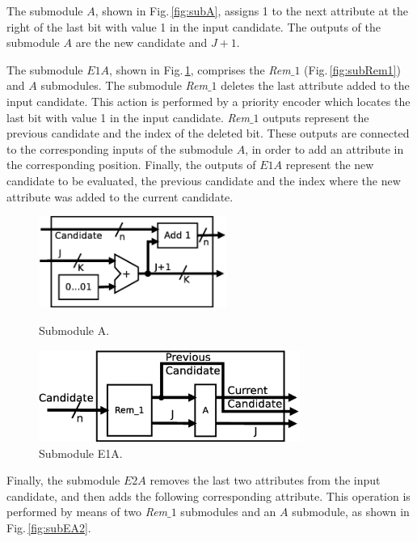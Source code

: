 \documentclass[authoryear,preprint,review,12pt]{elsarticle}
\begin{document}
The submodule $A$, shown in Fig.\,\ref{fig:subA}, assigns 1 to the next attribute at the right of 
the last bit with value 1 in the input candidate. The outputs of the submodule $A$ are the new candidate 
and $J+1$.

The submodule $E1A$, shown in Fig.\,\ref{fig:subEA1}, comprises the \textit{Rem$\_1$} 
(Fig.\,\ref{fig:subRem1}) and $A$ submodules. 
The submodule \textit{Rem$\_1$} deletes the last attribute added to the input candidate. 
This action is performed by a priority encoder which locates the last bit with value 1 in the input candidate. 
\textit{Rem$\_1$} outputs represent the previous candidate and the index of the deleted bit. 
These outputs are connected to the corresponding inputs of the
submodule $A$, in order to add an attribute in the corresponding position. Finally, the outputs of $E1A$ 
represent the new candidate to be evaluated, the previous candidate and the index where the new attribute 
was added to the current candidate.

\begin{figure}[htb]
\centering
\begin{minipage}{.5\textwidth}
  \centering
   \includegraphics[width=.7\linewidth , height=3cm]{Add1.eps}
  \caption{Submodule A.}
  \label{fig:subA}
\end{minipage}%
\begin{minipage}{.5\textwidth}
  \centering
   \includegraphics[width=\linewidth , height=3cm]{EA1.eps}
  \caption{Submodule E1A.}
  \label{fig:subEA1}
\end{minipage}
\end{figure}

Finally, the submodule $E2A$ removes the last two attributes from the
input candidate, and then adds the following corresponding attribute. This 
operation is performed by means of two \textit{Rem$\_1$} submodules and an $A$ submodule, as 
shown in Fig.\,\ref{fig:subEA2}.
\end{document}
